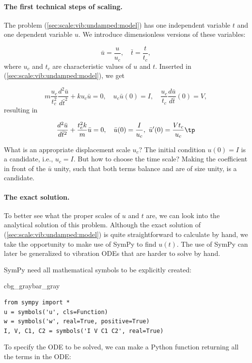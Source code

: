 \documentclass[graybox,envcountchap,sectrefs,final]{svmonodo}
\newenvironment{_pro_tight}[2]{
   \def\FrameCommand{\color{#2}\vrule width 1mm\normalcolor\colorbox{#1}}
   \FrameRule0.6pt\MakeFramed {\advance\hsize-2mm\FrameRestore}\vskip3mm}
   {\vskip0mm\endMakeFramed}
\newenvironment{pro}[2]{
\bgroup\rmfamily
\fboxsep=0mm\relax
\begin{_pro_tight}{#1}{#2}
\list{}{\parsep=-2mm\parskip=0mm\topsep=0pt\leftmargin=2mm
\rightmargin=2\leftmargin\leftmargin=4pt\relax}
\item\relax}
{\endlist\end{_pro_tight}\egroup}
\begin{document}
\paragraph{The first technical steps of scaling.}
The problem (\ref{sec:scale:vib:undamped:model}) has one independent
variable $t$ and one dependent variable $u$. We introduce dimensionless
versions of these variables:

\[ \bar u =\frac{u}{u_c},\quad\bar t = \frac{t}{t_c},\]
where $u_c$ and $t_c$ are characteristic values of $u$ and $t$.
Inserted in (\ref{sec:scale:vib:undamped:model}), we get

\[ m\frac{u_c}{t_c^2}\frac{d^2\bar u}{d\bar t^2} + ku_c\bar u = 0,
\quad u_c\bar u(0)=I,\quad \frac{u_c}{t_c}\frac{d\bar u}{d\bar t}(0)=V,\]
resulting in

\begin{equation}
\frac{d^2\bar u}{d\bar t^2} + \frac{t_c^2 k}{m}\bar u = 0,
\quad \bar u(0)=\frac{I}{u_c},\ \bar u'(0)=\frac{Vt_c}{u_c}\tp
\label{sec:scale:vib:undamped:model:scaled0}
\end{equation}

What is an appropriate displacement scale $u_c$? The initial condition
$u(0)=I$ is a candidate, i.e., $u_c=I$. But how to choose the time scale?
Making the coefficient in front of the $\bar u$ unity, such that
both terms balance and are of size unity, is a candidate.

\paragraph{The exact solution.}
To better see what the proper scales of $u$ and $t$ are, we can look
into the analytical solution of this problem.
Although the exact solution of
(\ref{sec:scale:vib:undamped:model}) is quite straightforward to calculate
by hand, we take the opportunity to make use of SymPy to
find $u(t)$. The use of SymPy can later be generalized to vibration
ODEs that are harder to solve by hand.

SymPy need all mathematical symbols to be explicitly created:

\begin{pro}{cbg_gray}{bar_gray}\begin{Verbatim}[numbers=none,fontsize=\fontsize{9pt}{9pt},baselinestretch=0.95,xleftmargin=2mm]
from sympy import *
u = symbols('u', cls=Function)
w = symbols('w', real=True, positive=True)
I, V, C1, C2 = symbols('I V C1 C2', real=True)
\end{Verbatim}
\end{pro}
\noindent
To specify the ODE to be solved, we can make a Python function returning
all the terms in the ODE:
\end{document}
